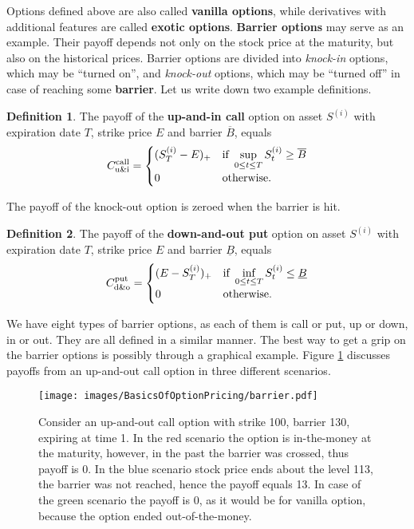 \documentclass[a4paper,11pt, twoside]{book}
\theoremstyle{definition}
\newtheorem{mydef}{Definition}[chapter]
\theoremstyle{remark}
\newcounter{example}[chapter]
\begin{document}
Options defined above are also called \textbf{vanilla options}, while derivatives with additional features are called \textbf{exotic options}. \textbf{Barrier options} may serve as an example. Their payoff depends not only on the stock price at the maturity, but also on the historical prices. Barrier options are divided into \textit{knock-in} options, which may be ``turned on'', and \textit{knock-out} options, which may be ``turned off'' in case of reaching some \textbf{barrier}. Let us write down two example definitions.
\begin{mydef}
The payoff of the \textbf{up-and-in call} option on asset $S^{(i)}$ with expiration date $T$, strike price $E$ and barrier $\overline{B}$, equals
\[ C^{\hbox{\scriptsize call}}_{\hbox{\scriptsize u\&i}} = 
\begin{cases}
 (S^{(i)}_T - E)_+    & \hbox{if } \sup\limits_{0 \leq t \leq T} S^{(i)}_t \geq \overline{B}\\
 0                    & \hbox{otherwise.}
\end{cases}
\]
\end{mydef}
\noindent The payoff of the knock-out option is zeroed when the barrier is hit.
\begin{mydef}
The payoff of the \textbf{down-and-out put} option on asset $S^{(i)}$ with expiration date $T$, strike price $E$ and barrier $\underline{B}$, equals
\[ C^{\hbox{\scriptsize put}}_{\hbox{\scriptsize d\&o}} = 
\begin{cases}
 (E - S^{(i)}_T)_+    & \hbox{if } \inf\limits_{0 \leq t \leq T} S^{(i)}_t \leq \underline{B}\\
 0                    & \hbox{otherwise.}
\end{cases}
\]
\end{mydef}
We have eight types of barrier options, as each of them is call or put, up or down, in or out. They are all defined in a similar manner. The best way to get a grip on the barrier options is possibly through a graphical example. Figure \ref{fig:barrier} discusses payoffs from an up-and-out call option in three different scenarios. 
\begin{figure}
\centering
 \texttt{[image: images/BasicsOfOptionPricing/barrier.pdf]}
\caption{Consider an up-and-out call option with strike 100, barrier 130, expiring at time 1. In the red scenario the option is in-the-money at the maturity, however, in the past the barrier was crossed, thus payoff is 0. In the blue scenario stock price ends about the level 113, the barrier was not reached, hence the payoff equals 13. In case of the green scenario the payoff is 0, as it would be for vanilla option, because the option ended out-of-the-money. }
\label{fig:barrier}
\end{figure}
\end{document}

